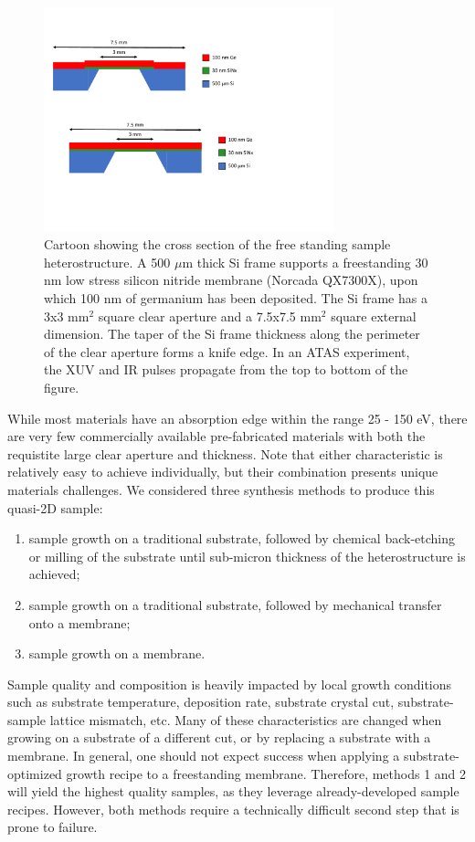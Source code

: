 \begin{figure}
	\centering
	\includegraphics[width=0.75\textwidth]{figures/chap4/Sample_Geometry.pdf}
	\caption{Cartoon showing the cross section of the free standing sample heterostructure. A 500 $\mu$m thick Si frame supports a freestanding 30 nm low stress silicon nitride membrane (Norcada QX7300X), upon which 100 nm of germanium has been deposited. The Si frame has a 3x3 mm$^2$ square clear aperture and a 7.5x7.5 mm$^2$ square external dimension. The taper of the Si frame thickness along the perimeter of the clear aperture forms a knife edge. In an ATAS experiment, the XUV and IR pulses propagate from the top to bottom of the figure.}
	\label{fig:Sample_Geometry}
\end{figure}

While most materials have an absorption edge within the range 25 - 150 eV, there are very few commercially available pre-fabricated materials with both the requistite large clear aperture and thickness. Note that either characteristic is relatively easy to achieve individually, but their combination presents unique materials challenges. We considered three synthesis methods to produce this quasi-2D sample:
\begin{enumerate}
	\item sample growth on a traditional substrate, followed by chemical back-etching or milling of the substrate until sub-micron thickness of the heterostructure is achieved;
	\item sample growth on a traditional substrate, followed by mechanical transfer onto a membrane;
	\item sample growth on a membrane.
\end{enumerate}
Sample quality and composition is heavily impacted by local growth conditions such as substrate temperature, deposition rate, substrate crystal cut, substrate-sample lattice mismatch, etc. Many of these characteristics are changed when growing on a substrate of a different cut, or by replacing a substrate with a membrane. In general, one should not expect success when applying a substrate-optimized growth recipe to a freestanding membrane. Therefore, methods 1 and 2 will yield the highest quality samples, as they leverage already-developed sample recipes. However, both methods require a technically difficult second step that is prone to failure.


